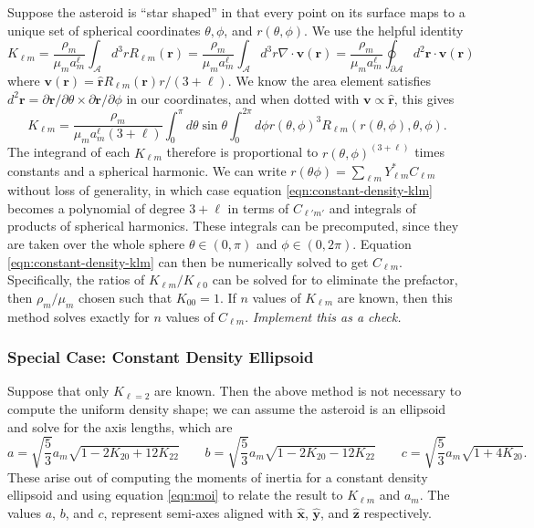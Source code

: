 \documentclass{aastex631}
\newcommand{\unit}[1]{\hat{\bm{#1}}}
\newcommand{\jtd}[1]{{\color{red}\textit{#1}}}
\begin{document}
Suppose the asteroid is ``star shaped'' in that every point on its surface maps to a unique set of spherical coordinates $\theta, \phi$, and $r(\theta, \phi)$. We use the helpful identity
\begin{equation}
  K_{\ell m} = \frac{\rho_m}{\mu_m a_m^\ell} \int_\mathcal{A} d^3 r R_{\ell m} (\bm r)
   = \frac{\rho_m}{\mu_m a_m^\ell} \int_\mathcal{A} d^3 r \nabla \cdot \bm v (\bm r)
    = \frac{\rho_m}{\mu_m a_m^\ell} \oint_{\partial \mathcal{A}} d^2 \bm r \cdot \bm v (\bm r)
\end{equation}
where $\bm v (\bm r) = \unit r R_{\ell m} (\bm r) r / (3+\ell) $. We know the area element satisfies $d^2 \bm r = \partial \bm r / \partial \theta \times \partial \bm r / \partial \phi$ in our coordinates, and when dotted with $\bm v \propto \unit r$, this gives
\begin{equation}
  K_{\ell m} = \frac{\rho_m}{\mu_m a_m^\ell(3 + \ell)} \int_0^\pi d\theta \sin \theta\int_0^{2\pi}d\phi r(\theta, \phi)^3 R_{\ell m}(r(\theta, \phi), \theta, \phi).
  \label{eqn:constant-density-klm}
\end{equation}
The integrand of each $K_{\ell m}$ therefore is proportional to $r(\theta, \phi)^(3+\ell)$ times constants and a spherical harmonic. We can write $r(\theta \phi) = \sum_{\ell m} Y_{\ell m}^* C_{\ell m}$ without loss of generality, in which case equation \ref{eqn:constant-density-klm} becomes a polynomial of degree $3+\ell$ in terms of $C_{\ell' m'}$ and integrals of products of spherical harmonics. These integrals can be precomputed, since they are taken over the whole sphere $\theta \in (0, \pi)$ and $\phi \in (0, 2\pi)$. Equation \ref{eqn:constant-density-klm} can then be numerically solved to get $C_{\ell m}$. Specifically, the ratios of $K_{\ell m} / K_{\ell 0}$ can be solved for to eliminate the prefactor, then $\rho_m / \mu_m$ chosen such that $K_{00} = 1$. If $n$ values of $K_{\ell m}$ are known, then this method solves exactly for $n$ values of $C_{\ell m}$.
\jtd{Implement this as a check.}


\subsubsection{Special Case: Constant Density Ellipsoid}
\label{sec:constant-density-ellipsoid}
Suppose that only $K_{\ell = 2}$ are known. Then the above method is not necessary to compute the uniform density shape; we can assume the asteroid is an ellipsoid and solve for the axis lengths, which are
\begin{equation}
a = \sqrt{\frac{5}{3}}a_m\sqrt{1-2K_{20}+12K_{22}} \qquad b = \sqrt{\frac{5}{3}}a_m\sqrt{1-2K_{20}-12K_{22}} \qquad c = \sqrt{\frac{5}{3}}a_m\sqrt{1+4K_{20}}.
\label{eqn:ellipsoid-klm}
\end{equation}
These arise out of computing the moments of inertia for a constant density ellipsoid and using equation \ref{eqn:moi} to relate the result to $K_{\ell m}$ and $a_m$. The values $a$, $b$, and $c$, represent semi-axes aligned with $\unit x$, $\unit y$, and $\unit z$ respectively.
\end{document}
